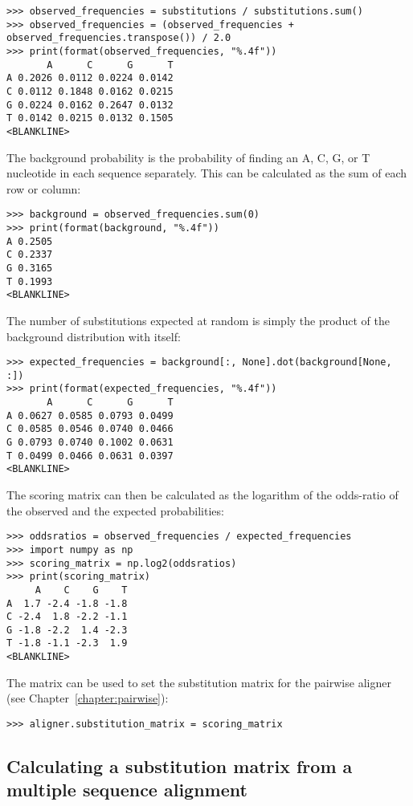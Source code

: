 \begin{verbatim}
>>> observed_frequencies = substitutions / substitutions.sum()
>>> observed_frequencies = (observed_frequencies + observed_frequencies.transpose()) / 2.0
>>> print(format(observed_frequencies, "%.4f"))
       A      C      G      T
A 0.2026 0.0112 0.0224 0.0142
C 0.0112 0.1848 0.0162 0.0215
G 0.0224 0.0162 0.2647 0.0132
T 0.0142 0.0215 0.0132 0.1505
<BLANKLINE>
\end{verbatim}
The background probability is the probability of finding an A, C, G, or T nucleotide in each sequence separately. This can be calculated as the sum of each row or column:

\begin{verbatim}
>>> background = observed_frequencies.sum(0)
>>> print(format(background, "%.4f"))
A 0.2505
C 0.2337
G 0.3165
T 0.1993
<BLANKLINE>
\end{verbatim}
The number of substitutions expected at random is simply the product of the background distribution with itself:

\begin{verbatim}
>>> expected_frequencies = background[:, None].dot(background[None, :])
>>> print(format(expected_frequencies, "%.4f"))
       A      C      G      T
A 0.0627 0.0585 0.0793 0.0499
C 0.0585 0.0546 0.0740 0.0466
G 0.0793 0.0740 0.1002 0.0631
T 0.0499 0.0466 0.0631 0.0397
<BLANKLINE>
\end{verbatim}
The scoring matrix can then be calculated as the logarithm of the odds-ratio of the observed and the expected probabilities:

\begin{verbatim}
>>> oddsratios = observed_frequencies / expected_frequencies
>>> import numpy as np
>>> scoring_matrix = np.log2(oddsratios)
>>> print(scoring_matrix)
     A    C    G    T
A  1.7 -2.4 -1.8 -1.8
C -2.4  1.8 -2.2 -1.1
G -1.8 -2.2  1.4 -2.3
T -1.8 -1.1 -2.3  1.9
<BLANKLINE>
\end{verbatim}
The matrix can be used to set the substitution matrix for the pairwise aligner (see Chapter~\ref{chapter:pairwise}):

\begin{verbatim}
>>> aligner.substitution_matrix = scoring_matrix
\end{verbatim}

\subsection{Calculating a substitution matrix from a multiple sequence alignment}
\label{sec:subs_mat_ex}

